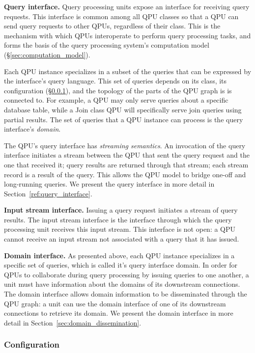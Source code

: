 \bigskip
\noindent
\textbf{Query interface.}
Query processing units expose an interface for receiving query requests.
This interface is common among all QPU classes so that a QPU can send query requests to other QPUs, regardless of their class.
This is the mechanism with which QPUs interoperate to perform query processing tasks,
and forms the basis of the query processing system's computation model (\S\ref{sec:computation_model}).

Each QPU instance specializes in a subset of the queries that can be expressed by the interface's query
language.
This set of queries depends on its class, its configuration (\S\ref{sec:qpu_config}), and the topology of the parts of the QPU graph is is connected to.
For example, a QPU may only serve queries about a specific database table,
while a Join class QPU will specifically serve join queries using partial results.
The set of queries that a QPU instance can process is the query interface's \textit{domain}.

The QPU's query interface has \textit{streaming semantics}.
An invocation of the query interface initiates a stream between the QPU that sent the query request and the one that
received it;
query results are returned through that stream; each stream record is a result of the query.
This allows the QPU model to bridge one-off and long-running queries.
We present the query interface in more detail in Section~\ref{ref:query_interface}.

\bigskip
\noindent
\textbf{Input stream interface.}
Issuing a query request initiates a stream of query results.
The input stream interface is the interface through which the query processing unit receives this input stream.
This interface is not open:
a QPU cannot receive an input stream not associated with a query that it has issued.

\bigskip
\noindent
\textbf{Domain interface.}
As presented above, each QPU instance specializes in a specific set of queries,
which is called it's query interface domain.
In order for QPUs to collaborate during query processing by issuing queries to one another,
a unit must have information about the domains of its downstream connections.
The domain interface allows domain information to be disseminated through the QPU graph:
a unit can use the domain interface of one of its downstream connections to retrieve its domain.
We present the domain interface in more detail in Section~\ref{sec:domain_dissemination}.

\subsubsection{Configuration}
\label{sec:qpu_config}

